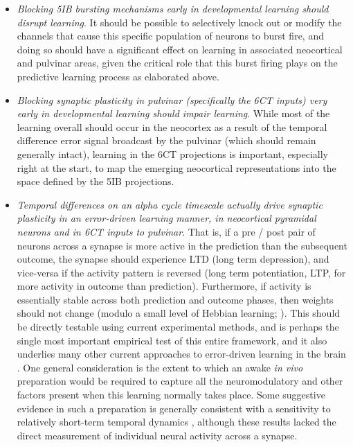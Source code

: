 \documentclass[11pt,twoside]{article}
\newif\myifpdf
\begin{document}
\begin{itemize}
	\item \emph{Blocking 5IB bursting mechanisms early in developmental learning should disrupt learning}.  It should be possible to selectively knock out or modify the channels that cause this specific population of neurons to burst fire, and doing so should have a significant effect on learning in associated neocortical and pulvinar areas, given the critical role that this burst firing plays on the predictive learning process as elaborated above.

	\item \emph{Blocking synaptic plasticity in pulvinar (specifically the 6CT inputs) very early in developmental learning should impair learning}.  While most of the learning overall should occur in the neocortex as a result of the temporal difference error signal broadcast by the pulvinar (which should remain generally intact), learning in the 6CT projections is important, especially right at the start, to map the emerging neocortical representations into the space defined by the 5IB projections.

	\item \emph{Temporal differences on an alpha cycle timescale actually drive synaptic plasticity in an error-driven learning manner, in neocortical pyramidal neurons and in 6CT inputs to pulvinar}.  That is, if a pre / post pair of neurons across a synapse is more active in the prediction than the subsequent outcome, the synapse should experience LTD (long term depression), and vice-versa if the activity pattern is reversed (long term potentiation, LTP, for more activity in outcome than prediction).  Furthermore, if activity is essentially stable across both prediction and outcome phases, then weights should not change (modulo a small level of Hebbian learning; \citealp{OReillyMunakata00,OReillyMunakataFrankEtAl12}).  This should be directly testable using current  experimental methods, and is perhaps the single most important empirical test of this entire framework, and it also underlies many other current approaches to error-driven learning in the brain \citep{BengioMesnardFischerEtAl17,WhittingtonBogacz19,LillicrapSantoroMarrisEtAl20}.  One general consideration is the extent to which an awake \emph{in vivo} preparation would be required to capture all the neuromodulatory and other factors present when this learning normally takes place.  Some suggestive evidence in such a preparation is generally consistent with a sensitivity to relatively short-term temporal dynamics \citep{LimMcKeeWoloszynEtAl15}, although these results lacked the direct measurement of individual neural activity across a synapse.

\end{itemize}
\end{document}
